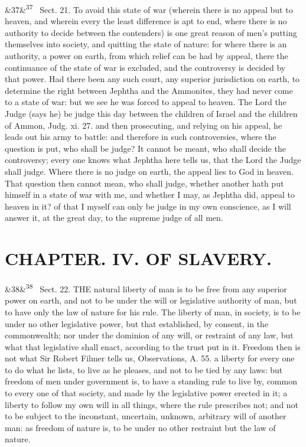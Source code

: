 \documentclass[12pt]{article}
\newcommand{\para}[1][]{\par\noindent\ifx&#1&\else\textsuperscript{\footnotesize #1}~\fi}
\begin{document}
\para[37] Sect. 21. To avoid this state of war (wherein there is no appeal but to heaven, and wherein every the least difference is apt to end, where there is no authority to decide between the contenders) is one great reason of men's putting themselves into society, and quitting the state of nature: for where there is an authority, a power on earth, from which relief can be had by appeal, there the continuance of the state of war is excluded, and the controversy is decided by that power. Had there been any such court, any superior jurisdiction on earth, to determine the right between Jephtha and the Ammonites, they had never come to a state of war: but we see he was forced to appeal to heaven. The Lord the Judge (says he) be judge this day between the children of Israel and the children of Ammon, Judg. xi. 27. and then prosecuting, and relying on his appeal, he leads out his army to battle: and therefore in such controversies, where the question is put, who shall be judge? It cannot be meant, who shall decide the controversy; every one knows what Jephtha here tells us, that the Lord the Judge shall judge. Where there is no judge on earth, the appeal lies to God in heaven. That question then cannot mean, who shall judge, whether another hath put himself in a state of war with me, and whether I may, as Jephtha did, appeal to heaven in it? of that I myself can only be judge in my own conscience, as I will answer it, at the great day, to the supreme judge of all men.

\section*{CHAPTER. IV. OF SLAVERY.}

\para[38] Sect. 22. THE natural liberty of man is to be free from any superior power on earth, and not to be under the will or legislative authority of man, but to have only the law of nature for his rule. The liberty of man, in society, is to be under no other legislative power, but that established, by consent, in the commonwealth; nor under the dominion of any will, or restraint of any law, but what that legislative shall enact, according to the trust put in it. Freedom then is not what Sir Robert Filmer tells us, Observations, A. 55. a liberty for every one to do what he lists, to live as he pleases, and not to be tied by any laws: but freedom of men under government is, to have a standing rule to live by, common to every one of that society, and made by the legislative power erected in it; a liberty to follow my own will in all things, where the rule prescribes not; and not to be subject to the inconstant, uncertain, unknown, arbitrary will of another man: as freedom of nature is, to be under no other restraint but the law of nature.
\end{document}
